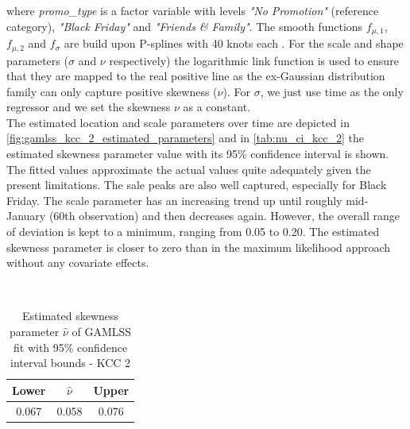 where \textit{promo\_type} is a factor variable with levels \textit{"No Promotion"} (reference category), \textit{"Black Friday"} and \textit{"Friends \& Family"}. The smooth functions $f_{\mu ,1}$, $f_{\mu ,2}$ and $f_{\sigma}$ are build upon P-splines with 40 knots each \citep{fahrmeir2003regression}. For the scale and shape parameters ($\sigma$ and $\nu$ respectively) the logarithmic link function is used to ensure that they are mapped to the real positive line as the ex-Gaussian distribution family can only capture positive skewness ($\nu$). For $\sigma$, we just use time as the only regressor and we set the skewness $\nu$ as a constant.\\
 The estimated location and scale parameters over time are depicted in \autoref{fig:gamlss_kcc_2_estimated_parameters} and in \autoref{tab:nu_ci_kcc_2} the estimated skewness parameter value with its 95\% confidence interval is shown. The fitted values approximate the actual values quite adequately given the present limitations. The sale peaks are also well captured, especially for Black Friday. The scale parameter has an increasing trend up until roughly mid-January (60th observation) and then decreases again. However, the overall range of deviation is kept to a minimum, ranging from 0.05 to 0.20. The estimated skewness parameter is closer to zero than in the maximum likelihood approach without any covariate effects.
\\


\begin{table}[H]
\setlength\arrayrulewidth{1pt}  
\centering
\begin{adjustbox}{max width=\textwidth}\
\begin{tabular}{c|c|c}
\hline
\rowcolor{white} 
\textbf{Lower} & $\hat{\nu}$ & \textbf{Upper} \\ \hline\hline
0.067        & 0.058           & 0.076        \\ \hline
\end{tabular}
\end{adjustbox}
\caption{Estimated skewness parameter $\hat{\nu}$ of GAMLSS fit with 95\% confidence interval bounds - KCC 2}
\label{tab:nu_ci_kcc_2}
\end{table}


